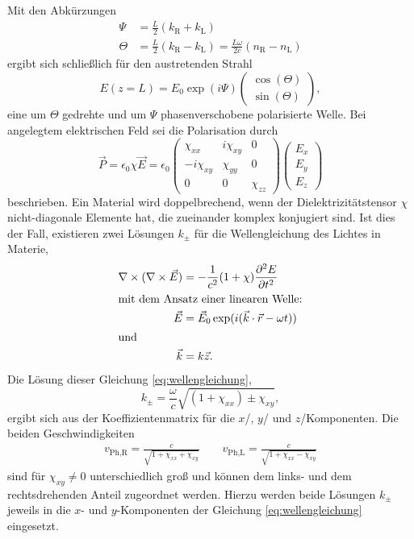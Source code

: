 Mit den Abkürzungen
\begin{align}
    \Psi &= \frac{L}{2} (k_\text{R}+k_\text{L})\\
    \Theta &= \frac{L}{2} (k_\text{R}-k_\text{L}) = \frac{L\omega}{2 c} (n_\text{R}-n_\text{L}) \label{eq:abk_theta}
\end{align}
ergibt sich schließlich für den austretenden Strahl
\begin{equation}
    E(z=L) = E_0 \exp(i\Psi)\begin{pmatrix} \cos(\Theta)\\\sin(\Theta)\end{pmatrix},
\end{equation}
eine um $\Theta$ gedrehte und um $\Psi$ phasenverschobene polarisierte Welle.
Bei angelegtem elektrischen Feld sei die Polarisation durch
\begin{equation}
    \vec P = \epsilon_0 \chi \vec E = \epsilon_0 \begin{pmatrix} \chi_{xx} & i\chi_{xy} & 0 \\ -i\chi_{xy} & \chi_{yy} & 0 \\ 0 & 0 & \chi_{zz} \end{pmatrix} \begin{pmatrix} E_x\\E_y\\E_z \end{pmatrix}
    \label{eq:polarisation}
\end{equation}
beschrieben.
Ein Material wird doppelbrechend, wenn der Dielektrizitätstensor $\chi$ nicht-diagonale Elemente hat, die zueinander komplex konjugiert sind.
Ist dies der Fall, existieren zwei Lösungen $k_{\pm}$ für die Wellengleichung des Lichtes in Materie,
\begin{align}
    \nabla\times(\nabla\times\vec E) &= -\frac{1}{c^2}(1+\chi)\frac{\partial^2 E}{\partial t^2}\label{eq:wellengleichung}\\
    \intertext{mit dem Ansatz einer linearen Welle:}
    \vec E &= \vec E_0 \exp(i(\vec k \cdot \vec r - \omega t))\\
    \shortintertext{und}
    \vec k &= k \vec z.
\end{align}
Die Lösung dieser Gleichung \eqref{eq:wellengleichung},
\begin{equation}
    k_\pm = \frac{\omega}{c}\sqrt{(1+\chi_{xx})\pm\chi_{xy}},
\end{equation}
ergibt sich aus der Koeffizientenmatrix für die $x$\-/, $y$\-/ und $z$\-/Komponenten.
Die beiden Geschwindigkeiten
\begin{align}
    v_\text{Ph,R}=\frac{c}{\sqrt{1+\chi_{xx}+\chi_{xy}}} \qquad v_\text{Ph,L}=\frac{c}{\sqrt{1+\chi_{xx}-\chi_{xy}}}
\end{align}
sind für $\chi_{xy}\neq0$ unterschiedlich groß und können dem links- und dem rechtsdrehenden Anteil zugeordnet werden.
Hierzu werden beide Lösungen $k_\pm$ jeweils in die $x$- und $y$-Komponenten der Gleichung \eqref{eq:wellengleichung}
eingesetzt.

